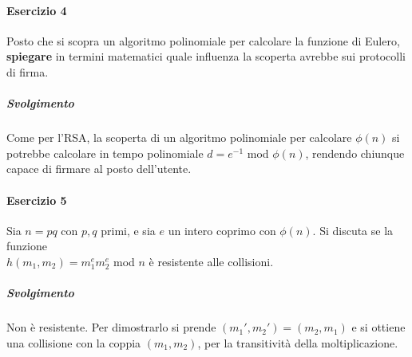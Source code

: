 \documentclass[10pt]{book}
\begin{document}
\paragraph{Esercizio 4} Posto che si scopra un algoritmo polinomiale per calcolare la funzione di Eulero, \textbf{spiegare} in termini matematici quale influenza la scoperta avrebbe sui protocolli di firma.
\subparagraph{Svolgimento} Come per l'RSA, la scoperta di un algoritmo polinomiale per calcolare $\phi(n)$ si potrebbe calcolare in tempo polinomiale $d = e^{-1}$ mod $\phi(n)$, rendendo chiunque capace di firmare al posto dell'utente.
\paragraph{Esercizio 5} Sia $n = pq$ con $p,q$ primi, e sia $e$ un intero coprimo con $\phi(n)$. Si discuta se la funzione\\ $h(m_1,m_2) = m_1^em_2^e$ mod $n$ è resistente alle collisioni.
\subparagraph{Svolgimento} Non è resistente. Per dimostrarlo si prende $(m_1',m_2')=(m_2,m_1)$ e si ottiene una collisione con la coppia $(m_1,m_2)$, per la transitività della moltiplicazione.

\pagebreak
\end{document}
